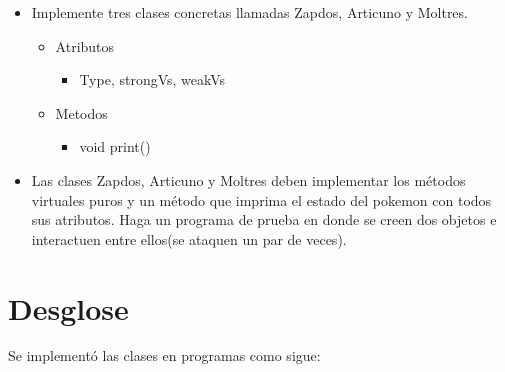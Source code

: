 \documentclass[11pt]{article}
\begin{document}
\begin{itemize}
\item Implemente tres clases concretas llamadas Zapdos, Articuno y Moltres.  
    \begin{itemize}
    \item Atributos
        \begin{itemize}
             \item Type, strongVs, weakVs
        \end{itemize}
    \item Metodos
        \begin{itemize}
             \item void print()
        \end{itemize}
    \end{itemize}
    
\item  Las clases  Zapdos, Articuno y Moltres deben implementar los m\'etodos virtuales puros y un m\'etodo que imprima el estado del pokemon con todos sus atributos. Haga un programa de prueba en donde se creen dos objetos e interactuen entre ellos(se ataquen un par de veces).  
    
\end{itemize}

\section{Desglose}
Se implementó las clases en programas como sigue:
\end{document}
